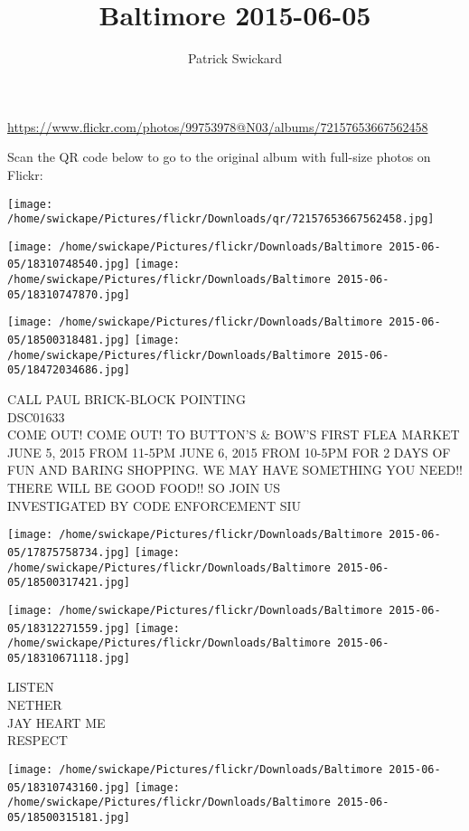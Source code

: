 \documentclass[10pt,letterpaper]{article}
\title{Baltimore 2015-06-05}
\author{Patrick Swickard}
\date{}
\begin{document}
\maketitle

\url{https://www.flickr.com/photos/99753978@N03/albums/72157653667562458}

Scan the QR code below to go to the original album with full-size photos on Flickr:

\texttt{[image: /home/swickape/Pictures/flickr/Downloads/qr/72157653667562458.jpg]}
\pagebreak

\texttt{[image: /home/swickape/Pictures/flickr/Downloads/Baltimore 2015-06-05/18310748540.jpg]}
\texttt{[image: /home/swickape/Pictures/flickr/Downloads/Baltimore 2015-06-05/18310747870.jpg]}

\texttt{[image: /home/swickape/Pictures/flickr/Downloads/Baltimore 2015-06-05/18500318481.jpg]}
\texttt{[image: /home/swickape/Pictures/flickr/Downloads/Baltimore 2015-06-05/18472034686.jpg]}

CALL PAUL BRICK{-}BLOCK POINTING\\
DSC01633\\
COME OUT!  COME OUT!  TO BUTTON'S \& BOW'S FIRST FLEA MARKET JUNE 5, 2015 FROM 11{-}5PM JUNE 6, 2015 FROM 10{-}5PM FOR 2 DAYS OF FUN AND BARING SHOPPING.  WE MAY HAVE SOMETHING YOU NEED!! THERE WILL BE GOOD FOOD!! SO JOIN US\\
INVESTIGATED BY CODE ENFORCEMENT SIU
\pagebreak

\texttt{[image: /home/swickape/Pictures/flickr/Downloads/Baltimore 2015-06-05/17875758734.jpg]}
\texttt{[image: /home/swickape/Pictures/flickr/Downloads/Baltimore 2015-06-05/18500317421.jpg]}

\texttt{[image: /home/swickape/Pictures/flickr/Downloads/Baltimore 2015-06-05/18312271559.jpg]}
\texttt{[image: /home/swickape/Pictures/flickr/Downloads/Baltimore 2015-06-05/18310671118.jpg]}

LISTEN\\
NETHER\\
JAY HEART ME\\
RESPECT
\pagebreak

\texttt{[image: /home/swickape/Pictures/flickr/Downloads/Baltimore 2015-06-05/18310743160.jpg]}
\texttt{[image: /home/swickape/Pictures/flickr/Downloads/Baltimore 2015-06-05/18500315181.jpg]}
\end{document}
